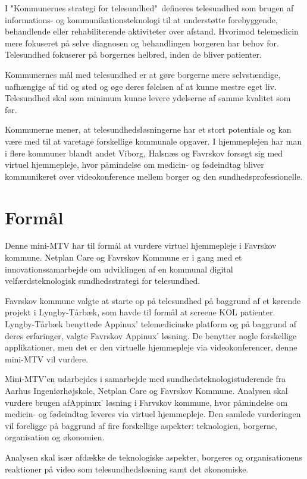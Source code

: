 I "Kommunernes strategi for telesundhed"\ defineres telesundhed som brugen af informations- og kommunikationsteknologi til at understøtte forebyggende, behandlende eller rehabiliterende aktiviteter over afstand. Hvorimod telemedicin mere fokuseret på selve diagnosen og behandlingen borgeren har behov for. Telesundhed fokuserer på borgernes helbred, inden de bliver patienter.\cite{KLs}\cite{sundhed}

Kommunernes mål med telesundhed er at gøre borgerne mere selvstændige, uafhængige af tid og sted og øge deres følelsen af at kunne mestre eget liv. Telesundhed skal som minimum kunne levere ydelserne af samme kvalitet som før.\cite{KLs}

Kommunerne mener, at telesundhedsløsningerne har et stort potentiale og kan være med til at varetage forskellige kommunale opgaver. I hjemmeplejen har man i flere kommuner blandt andet Viborg\cite{viborg}, Halsnæs\cite{hals} og Favrskov forsøgt sig med virtuel hjemmepleje, hvor påmindelse om medicin- og fødeindtag bliver kommunikeret over videokonference mellem borger og den sundhedsprofessionelle. 

\section{Formål}
Denne mini-MTV har til formål at vurdere virtuel hjemmepleje i Favrskov kommune. Netplan Care og Favrskov Kommune er i gang med et innovationssamarbejde om udviklingen af en kommunal digital velfærdsteknologisk sundhedsstrategi for telesundhed. 

Favrskov kommune valgte at starte op på telesundhed på baggrund af et kørende projekt i Lyngby-Tårbæk, som havde til formål at screene KOL patienter. Lyngby-Tårbæk benyttede Appinux' telemedicinske platform og på baggrund af deres erfaringer, valgte Favrskov Appinux' løsning.\cite{Karin} De benytter nogle forskellige applikationer, men det er den virtuelle hjemmepleje via videokonferencer, denne mini-MTV vil vurdere.    

Mini-MTV'en udarbejdes i samarbejde med sundhedsteknologistuderende fra Aarhus Ingeniørhøjskole, Netplan Care og Favrskov Kommune. Analysen skal vurdere brugen afAppinux' løsning i Farvskov kommune, hvor påmindelse om medicin- og fødeindtag leveres via virtuel hjemmepleje. Den samlede vurderingen vil foreligge på baggrund af fire forskellige aspekter: teknologien, borgerne, organisation og økonomien.  

Analysen skal især afdække de teknologiske aspekter, borgeres og organisationens reaktioner på video som telesundhedsløsning samt det økonomiske. 

